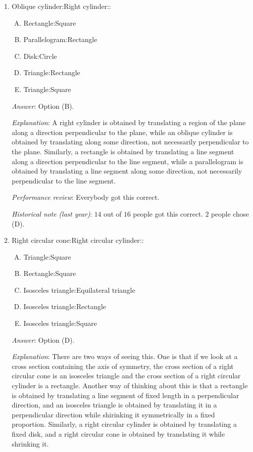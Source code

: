 \documentclass[10pt]{amsart}
\begin{document}
\begin{enumerate}
\item Oblique cylinder:Right cylinder::

  \begin{enumerate}[(A)]
  \item Rectangle:Square
  \item Parallelogram:Rectangle
  \item Disk:Circle
  \item Triangle:Rectangle
  \item Triangle:Square
  \end{enumerate}

  {\em Answer}: Option (B).

  {\em Explanation}: A right cylinder is obtained by translating a
  region of the plane along a direction perpendicular to the plane,
  while an oblique cylinder is obtained by translating along some
  direction, not necessarily perpendicular to the plane. Similarly, a
  rectangle is obtained by translating a line segment along a
  direction perpendicular to the line segment, while a parallelogram
  is obtained by translating a line segment along some direction, not
  necessarily perpendicular to the line segment.

  {\em Performance review}: Everybody got this correct.

  {\em Historical note (last year)}: $14$ out of $16$ people got this
  correct. $2$ people chose (D).

\item Right circular cone:Right circular cylinder::

  \begin{enumerate}[(A)]
  \item Triangle:Square
  \item Rectangle:Square
  \item Isosceles triangle:Equilateral triangle
  \item Isosceles triangle:Rectangle
  \item Isosceles triangle:Square
  \end{enumerate}

  {\em Answer}: Option (D).

  {\em Explanation}: There are two ways of seeing this. One is that if
  we look at a cross section containing the axis of symmetry, the
  cross section of a right circular cone is an isosceles triangle and
  the cross section of a right circular cylinder is a
  rectangle. Another way of thinking about this is that a rectangle is
  obtained by translating a line segment of fixed length in a
  perpendicular direction, and an isosceles triangle is obtained by
  translating it in a perpendicular direction while shirinking it
  symmetrically in a fixed proportion. Similarly, a right circular
  cylinder is obtained by translating a fixed disk, and a right
  circular cone is obtained by translating it while shrinking it.


\end{enumerate}
\end{document}
